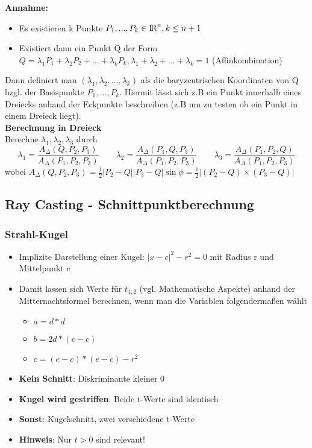 \textbf{Annahme:}
\begin{itemize}
	\item Es existieren k Punkte $P_1, ..., P_k \in {\rm I\!R}^n, k \leq n + 1$
	\item Existiert dann ein Punkt Q der Form $Q = \lambda_1P_1 + \lambda_2P_2 + ... + \lambda_kP_k, \lambda_1 + \lambda_2 + ... + \lambda_k = 1$ (\glqq Affinkombination\grqq)
\end{itemize}
Dann definiert man $(\lambda_1, \lambda_2, ..., \lambda_k)$ als die baryzentrischen Koordinaten von Q bzgl. der Basispunkte $P_1, ..., P_k$. Hiermit lässt sich z.B ein Punkt innerhalb eines Dreiecks anhand der Eckpunkte beschreiben (z.B um zu testen ob ein Punkt in einem Dreieck liegt).\\

\textbf{Berechnung in Dreieck}\\
Berechne $\lambda_1, \lambda_2, \lambda_3$ durch \\
$$\lambda_1 = \frac{A_{\Delta}(Q, P_2, P_3)}{A_\Delta(P_1, P_2, P_3)} \qquad \lambda_2 = \frac{A_{\Delta}(P_1, Q, P_3)}{A_\Delta(P_1, P_2, P_3)} \qquad \lambda_3 = \frac{A_{\Delta}(P_1, P_2, Q)}{A_\Delta(P_1, P_2, P_3)}$$
wobei $A_\Delta (Q, P_2, P_3) = \frac{1}{2} |P_2 - Q| | P_3 - Q | \sin \phi = \frac{1}{2} | (P_2 - Q) \times (P_3 - Q) |$
      
\newpage
\subsection{Ray Casting - Schnittpunktberechnung}%
\label{rt:sub:ray_casting_schnittpunktberechnung}

\subsubsection{Strahl-Kugel}%
\label{rt:ssub:strahl_kugel}

\begin{itemize}
	\item Implizite Darstellung einer Kugel: $|x - c|^2 - r^2 = 0$ mit Radius r und Mittelpunkt c
	\item Damit lassen sich Werte für $t_{1,2}$ (vgl. Mathematische Aspekte) anhand der Mitternachtsformel berechnen, wenn man die Variablen folgendermaßen wählt
	\begin{itemize}
		\item $a = d * d$
		\item $b = 2d * (e - c)$
		\item $c = (e - c) * (e - c) - r^2$
	\end{itemize}
	\item \textbf{Kein Schnitt}: Diskriminante kleiner 0
	\item \textbf{Kugel wird gestriffen}: Beide t-Werte sind identisch
	\item \textbf{Sonst}: Kugelschnitt, zwei verschiedene t-Werte
	\item \textbf{Hinweis}: Nur $t > 0$ sind relevant!
\end{itemize}

